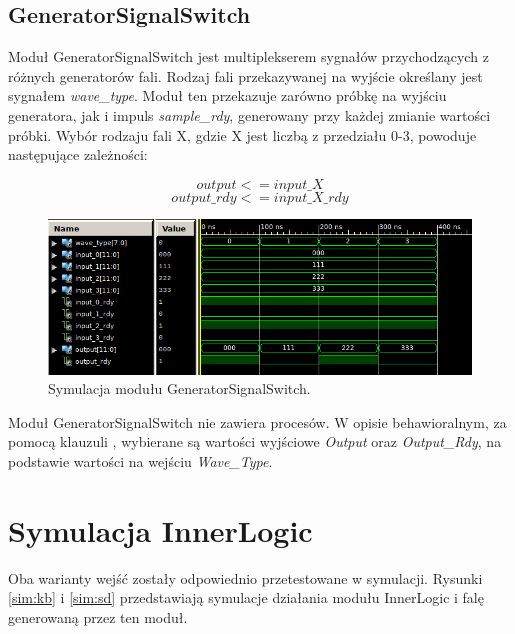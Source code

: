 \documentclass[a4paper,12pt]{article}
\begin{document}
\subsection{GeneratorSignalSwitch}

Moduł GeneratorSignalSwitch jest multiplekserem sygnałów przychodzących z różnych generatorów fali. Rodzaj fali przekazywanej na wyjście określany jest sygnałem \textit{wave\_type}. Moduł ten przekazuje zarówno próbkę na wyjściu generatora, jak i impuls \textit{sample\_rdy}, generowany przy każdej zmianie wartości próbki. Wybór rodzaju fali X, gdzie X jest liczbą z przedziału 0-3, powoduje następujące zależności:
\clearpage

\[output <= input\_X\]
\[output\_rdy <= input\_X\_rdy\]

\begin{figure}[H]
  \centering
  \includegraphics[decodearray={1 0 1 0 1 0}, width=\linewidth]{images/generator_signal_switch.png}
  \caption{Symulacja modułu GeneratorSignalSwitch.}
  \label{sim:gen_signal_switch}
\end{figure}

Moduł GeneratorSignalSwitch nie zawiera procesów. W opisie behawioralnym, za pomocą klauzuli , wybierane są wartości wyjściowe \textit{Output} oraz \textit{Output\_Rdy}, na podstawie wartości na wejściu \textit{Wave\_Type}.

\section{Symulacja InnerLogic}
Oba warianty wejść zostały odpowiednio przetestowane w symulacji. Rysunki \ref{sim:kb} i \ref{sim:sd} przedstawiają symulacje działania modułu InnerLogic i falę generowaną przez ten moduł.
\end{document}
